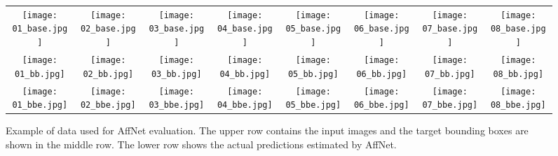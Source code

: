 \documentclass{bmvc2k}
\begin{document}
\begin{figure}[h]
\begin{center}
  \begin{tabular} {c c c c c c c c}
    \texttt{[image: 01\_base.jpg]} &
    \texttt{[image: 02\_base.jpg]} &
    \texttt{[image: 03\_base.jpg]} &
    \texttt{[image: 04\_base.jpg]} &
    \texttt{[image: 05\_base.jpg]} &
    \texttt{[image: 06\_base.jpg]} &
    \texttt{[image: 07\_base.jpg]} &
    \texttt{[image: 08\_base.jpg]} \\
    \texttt{[image: 01\_bb.jpg]} &
    \texttt{[image: 02\_bb.jpg]} &
    \texttt{[image: 03\_bb.jpg]} &
    \texttt{[image: 04\_bb.jpg]} &
    \texttt{[image: 05\_bb.jpg]} &
    \texttt{[image: 06\_bb.jpg]} &
    \texttt{[image: 07\_bb.jpg]} &
    \texttt{[image: 08\_bb.jpg]} \\
    \texttt{[image: 01\_bbe.jpg]} &
    \texttt{[image: 02\_bbe.jpg]} &
    \texttt{[image: 03\_bbe.jpg]} &
    \texttt{[image: 04\_bbe.jpg]} &
    \texttt{[image: 05\_bbe.jpg]} &
    \texttt{[image: 06\_bbe.jpg]} &
    \texttt{[image: 07\_bbe.jpg]} &
    \texttt{[image: 08\_bbe.jpg]} \\
  \end{tabular}
\end{center}
\caption{Example of data used for AffNet evaluation. The upper row contains the input images and the target bounding boxes are shown in the middle row. The lower row shows the actual predictions estimated by AffNet.}
\label{fig:affnet_data}
\end{figure}
\end{document}

